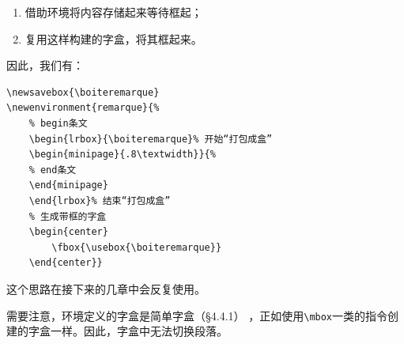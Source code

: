 \begin{enumerate}
    \item 借助环境将内容存储起来等待框起；
    \item 复用这样构建的字盒，将其框起来。
\end{enumerate}

因此，我们有：

\begin{dmd}
\begin{verbatim}
\newsavebox{\boiteremarque} 
\newenvironment{remarque}{%
    % begin条文
    \begin{lrbox}{\boiteremarque}% 开始“打包成盒”
    \begin{minipage}{.8\textwidth}}{%
    % end条文
    \end{minipage}
    \end{lrbox}% 结束“打包成盒”
    % 生成带框的字盒
    \begin{center}
        \fbox{\usebox{\boiteremarque}}
    \end{center}}
\end{verbatim}
\end{dmd}

\newsavebox{\boiteremarque} 
\renewenvironment{remarque}{%
    \begin{lrbox}{\boiteremarque}%
    \begin{minipage}{.8\textwidth}}{%
    \end{minipage}
    \end{lrbox}%
    \begin{center}
        \fbox{\usebox{\boiteremarque}}
    \end{center}}


这个思路在接下来的几章中会反复使用。

\begin{exclamation}
需要注意，环境定义的字盒是简单字盒（\S 4.4.1）%
，正如使用\verb|\mbox|一类的指令创建的字盒一样。因此，字盒中无法切换段落。
\end{exclamation}